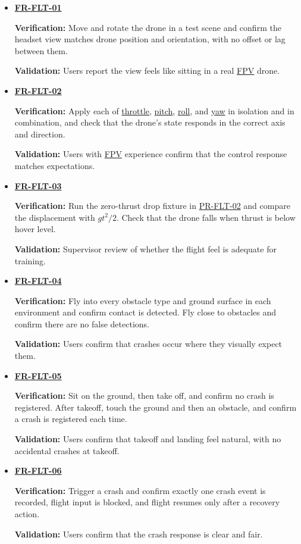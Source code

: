 \documentclass[12pt]{article}
\begin{document}
\begin{itemize}
\item \hyperlink{req:FR-FLT-01}{\textbf{FR-FLT-01}}\par
 \textbf{Verification:} Move and rotate the drone in a test scene and
 confirm the headset view matches drone position and orientation, with no
 offset or lag between them.\par
 \textbf{Validation:} Users report the view feels like sitting in a real \hyperlink{glos:FPV}{FPV} drone.
\item \hyperlink{req:FR-FLT-02}{\textbf{FR-FLT-02}}\par
 \textbf{Verification:} Apply each of \hyperlink{glos:Throttle}{throttle}, \hyperlink{glos:Throttle}{pitch}, \hyperlink{glos:Throttle}{roll}, and \hyperlink{glos:Throttle}{yaw} in
 isolation and in combination, and check that the drone's state responds in
 the correct axis and direction.\par
 \textbf{Validation:} Users with \hyperlink{glos:FPV}{FPV} experience confirm that the control
 response matches expectations.
\item \hyperlink{req:FR-FLT-03}{\textbf{FR-FLT-03}}\par
 \textbf{Verification:} Run the zero-thrust drop fixture in
 \hyperlink{req:PR-FLT-02}{PR-FLT-02} and compare the displacement with
 $gt^2/2$. Check that the drone falls when thrust is below hover level.\par
 \textbf{Validation:} Supervisor review of whether the flight feel is adequate
 for training.
\item \hyperlink{req:FR-FLT-04}{\textbf{FR-FLT-04}}\par
 \textbf{Verification:} Fly into every obstacle type and ground surface in
 each environment and confirm contact is detected. Fly close to obstacles and
 confirm there are no false detections.\par
 \textbf{Validation:} Users confirm that crashes occur where they visually expect them.
\item \hyperlink{req:FR-FLT-05}{\textbf{FR-FLT-05}}\par
 \textbf{Verification:} Sit on the ground, then take off, and confirm no
 crash is registered. After takeoff, touch the ground and then an obstacle,
 and confirm a crash is registered each time.\par
 \textbf{Validation:} Users confirm that takeoff and landing feel natural, with
 no accidental crashes at takeoff.
\item \hyperlink{req:FR-FLT-06}{\textbf{FR-FLT-06}}\par
 \textbf{Verification:} Trigger a crash and confirm exactly one crash event
 is recorded, flight input is blocked, and flight resumes only after a
 recovery action.\par
 \textbf{Validation:} Users confirm that the crash response is clear and fair.
\end{itemize}
\end{document}
